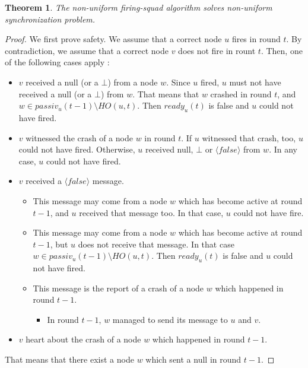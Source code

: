 \documentclass{article}
\newtheorem{theorem}{Theorem}
\begin{document}
\begin{theorem}
	The non-uniform firing-squad algorithm solves non-uniform synchronization problem.
\end{theorem}
\begin{proof}
	We first prove safety. We assume that a correct node $u$ fires in round $t$.
	By contradiction, we assume that a correct node $v$ does not fire in rount $t$.
	Then, one of the following cases apply :
	\begin{itemize}
		\item $v$ received a null (or a $\bot$) from a node $w$.
			Since $u$ fired, $u$ must not have received a null (or a $\bot$) from $w$. That means that $w$ crashed in round $t$, and $w \in passiv_u(t-1) \setminus HO(u, t)$.
			Then $ready_u(t)$ is false and $u$ could not have fired.
		\item $v$ witnessed the crash of a node $w$ in round $t$.
			If $u$ witnessed that crash, too, $u$ could not have fired.
			Otherwise, $u$ received null, $\bot$ or $\langle false \rangle$ from $w$.
			In any case, $u$ could not have fired.
		\item $v$ received a $\langle false \rangle$ message.
		\begin{itemize}
			\item This message may come from a node $w$ which has become active at round $t-1$, and $u$ received that message too.
				In that case, $u$ could not have fire.
			\item This message may come from a node $w$ which has become active at round $t-1$, but $u$ does not receive that message.
				In that case $w \in passiv_u(t-1) \setminus HO(u,t)$.
				Then $ready_u(t)$ is false and $u$ could not have fired.
			\item This message is the report of a crash of a node $w$ which happened in round $t-1$.
			\begin{itemize}
				\item In round $t-1$, $w$ managed to send its message to $u$ and $v$.

			\end{itemize}
		\end{itemize}
		\item $v$ heart about the crash of a node $w$ which happened in round $t-1$.
	\end{itemize}
	That means that there exist a node $w$ which sent a null in round $t-1$.

\end{proof}
\end{document}
